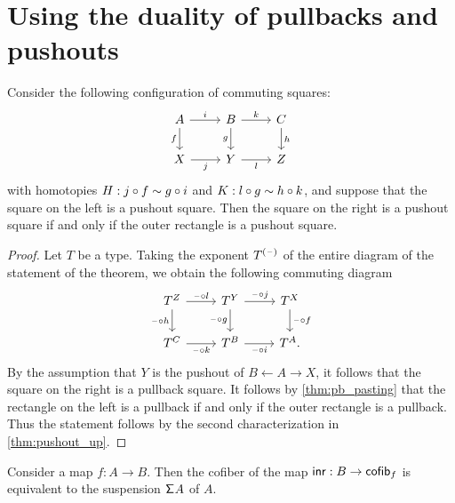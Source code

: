 \section{Using the duality of pullbacks and pushouts}
\begin{thm}\label{thm:pushout_pasting}
Consider the following configuration of commuting squares:
\begin{equation*}
\begin{tikzcd}
A \arrow[r,"i"] \arrow[d,swap,"f"] & B \arrow[r,"k"] \arrow[d,swap,"g"] & C \arrow[d,"h"] \\
X \arrow[r,swap,"j"] & Y \arrow[r,swap,"l"] & Z
\end{tikzcd}
\end{equation*}
with homotopies $H:j\circ f\sim g\circ i$ and $K:l\circ g\sim h\circ k$, and suppose that the square on the left is a pushout square. 
Then the square on the right is a pushout square if and only if the outer rectangle is a pushout square.
\end{thm}

\begin{proof}
Let $T$ be a type. Taking the exponent $T^{(\mathord{\hspace{1pt}\text{--}\hspace{1pt}})}$ of the entire diagram of the statement of the theorem, we obtain the following commuting diagram
\begin{equation*}
\begin{tikzcd}
T^Z \arrow[r,"\blank\circ l"] \arrow[d,swap,"\blank\circ h"] & T^Y \arrow[d,swap,"\blank\circ g"] \arrow[r,"\blank\circ j"] & T^X \arrow[d,"\blank\circ f"] \\
T^C \arrow[r,swap,"\blank\circ k"] & T^B \arrow[r,swap,"\blank\circ i"] & T^A.
\end{tikzcd}
\end{equation*}
By the assumption that $Y$ is the pushout of $B\leftarrow A \rightarrow X$, it follows that the square on the right is a pullback square. It follows by \autoref{thm:pb_pasting} that the rectangle on the left is a pullback if and only if the outer rectangle is a pullback. Thus the statement follows by the second characterization in \autoref{thm:pushout_up}.
\end{proof}

\begin{lem}
Consider a map $f:A\to B$. Then the cofiber of the map ${\mathsf{inr}}:B\to \mathsf{cofib}_f$ is equivalent to the suspension $\mathsf{\Sigma}^{}{A}$ of $A$. 
\end{lem}

